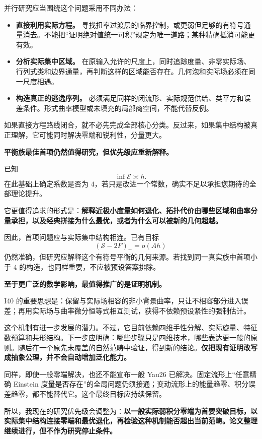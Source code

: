 \documentclass[
  10pt,
]{article}
\providecommand{\tightlist}{%
  \setlength{\itemsep}{0pt}\setlength{\parskip}{0pt}}
\begin{document}
并行研究应当围绕这个问题采用不同办法：

\begin{itemize}
\tightlist
\item
  \textbf{直接利用实际方程。}
  寻找扭率过渡层的临界控制，或更弱但足够的有符号通量消去。不能把``证明绝对值统一可积''规定为唯一道路；某种精确抵消可能更有效。
\item
  \textbf{分析实际集中区域。}
  在原输入允许的尺度上，同时追踪度量、非零实际场、行列式类和边界通量，再判断这样的区域能否存在。几何泡和实际场必须在同一尺度相遇。
\item
  \textbf{构造真正的逃逸序列。}
  必须满足同样的闭流形、实际规范供给、类平方和误差条件。形式曲率模型或未填充的局部商空间，不能代替反例。
\end{itemize}

如果直接方程路线闭合，就不必先完成全部核心分类。反过来，如果集中结构被真正理解，它可能同时解决零端和锐利性，分量更大。

\textbf{平衡族最佳首项仍然值得研究，但优先级应重新解释。}

已知 \[
\inf\mathcal E\asymp h.
\] 在此基础上确定系数是否为
\(4\)，若只是改进一个常数，确实不足以承担您期待的全部理论提升。

它更值得追求的形式是：\textbf{解释近极小度量如何退化、拓扑代价由哪些区域和曲率分量承担，以及经典拼接为什么最优，或者为什么可以被新的几何超越。}

因此，首项问题应与实际集中结构相连。已有目标 \[
(\mathscr S-2F)_+=o(Ah)
\]
仍然准确，但研究应解释这个有符号平衡的几何来源。若找到同一真实族中首项小于
\(4\) 的构造，也同样重要，不应被预设答案排除。

\textbf{至于更广泛的数学影响，最值得推广的是证明机制。}

I40
的重要思想是：保留与实际场相容的非小背景曲率，只让不相容部分进入误差；再用实际场与曲率微分恒等式相互测试，获得不依赖预设紧性的强制估计。

这个机制有进一步发展的潜力。不过，它目前依赖四维手性分解、实际旋量、特征数预算和共形结构。下一步应明确：哪些步骤只是四维技术，哪些表达更一般的原则。随后在一个原先未覆盖的自然范畴中验证，得到新的结论。\textbf{仅把现有证明改写成抽象公理，并不会自动增加泛化能力。}

同样，即使一般零端解决，也还不能宣布一般 Yau26
已解决。固定流形上``任意精确 Einstein
度量是否存在''的全局问题仍须接通；变动流形上的能量趋零、积分误差趋零，都不能替代它。这个最终目标应持续保留。

所以，我现在的研究优先级会调整为：\textbf{以一般实际弱积分零端为首要突破目标，以实际集中结构连接零端和最优退化，再检验这种机制能否超出当前范畴。论文整理继续进行，但不作为研究停止条件。}
\end{document}
